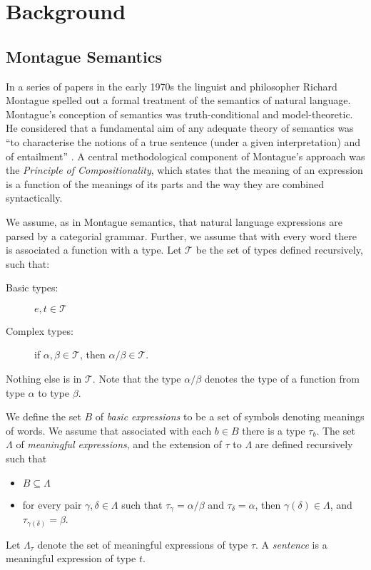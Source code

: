 \documentclass{svmult}
\begin{document}
\section{Background}

\subsection{Montague Semantics}

In a series of papers in the early 1970s \cite{Montague1970a,Montague1970b,Montague1973} the linguist and philosopher Richard Montague spelled out a formal treatment of the semantics of natural language. Montague's conception of semantics was truth-conditional and model-theoretic. He considered that a fundamental aim of any adequate theory of semantics was ``to characterise the notions of a true sentence (under a given interpretation) and of entailment'' \cite{Montague1970b}. A central methodological component of Montague's approach was the {\em Principle of Compositionality\/}, which states that the meaning of an expression is a function of the meanings of its parts and the way they are combined syntactically.


We assume, as in Montague semantics, that natural language expressions
are parsed by a categorial grammar. Further, we assume that with every word there is
associated a function with a type. Let $\mathcal{T}$ be the set of types defined
recursively, such that:
\begin{description}
\item [Basic types:] $e,t\in \mathcal{T}$
\item[Complex types:]  if $\alpha, \beta\in \mathcal{T}$, then $\alpha/\beta\in \mathcal{T}$.
\end{description}
Nothing else is in $\mathcal{T}$. Note that the type $\alpha/\beta$ denotes the type of a function from type
$\alpha$ to type $\beta$.

We define the set $B$ of \emph{basic expressions} to be a set of
symbols denoting meanings of words. We assume that associated with
each $b\in B$ there is a type $\tau_b$. The set $\Lambda$ of
\emph{meaningful expressions}, and the extension of $\tau$ to $\Lambda$ are
defined recursively such that
\begin{itemize}
\item $B\subseteq \Lambda$
\item for every pair $\gamma,\delta\in \Lambda$ such that $\tau_\gamma
  = \alpha/\beta$ and $\tau_\delta = \alpha$, then $\gamma(\delta)\in
  \Lambda$, and $\tau_{\gamma(\delta)} = \beta$.
\end{itemize}
Let $\Lambda_\tau$ denote the set of meaningful expressions of type
$\tau$. A \emph{sentence} is a meaningful expression of type $t$.
\end{document}
